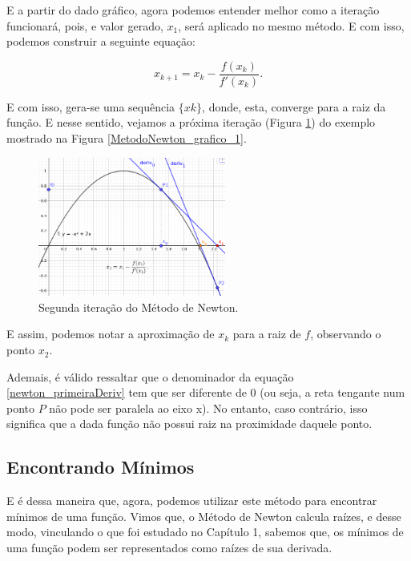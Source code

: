 E a partir do dado gráfico, agora podemos entender melhor como a iteração
funcionará, pois, e valor gerado, $x_1$, será aplicado no mesmo método. E com
isso, podemos construir a seguinte equação:

\begin{equation}
    x_{k+1} = x_{k} - \frac {f(x_{k})}{f'(x_{k})}.
    \label{newton_primeiraDeriv}
\end{equation}

E com isso, gera-se uma sequência $\{xk\}$, donde, esta, converge para a raiz
da função. E nesse sentido, vejamos a próxima iteração (Figura
\ref{MetodoNewton_grafico_2}) do exemplo mostrado na Figura
\ref{MetodoNewton_grafico_1}.

\begin{figure}[ht]
    \includegraphics[width=0.55\textwidth]
      {src/MetodoNewton_grafico_2.png}
    \centering
    \caption{
      \centering
      Segunda iteração do Método de Newton.
    }
    \label{MetodoNewton_grafico_2}
\end{figure}

E assim, podemos notar a aproximação de $x_k$ para a raiz de $f$, observando o
ponto $x_2$.

Ademais, é válido ressaltar que o denominador da equação
\ref{newton_primeiraDeriv} tem que ser diferente de 0 (ou seja, a reta tengante
num ponto $P$ não pode ser paralela ao eixo x). No entanto, caso contrário,
isso significa que a dada função não possui raiz na proximidade daquele ponto.

\subsection{Encontrando Mínimos}

E é dessa maneira que, agora, podemos utilizar este método para encontrar
mínimos de uma função. Vimos que, o Método de Newton calcula raízes, e
desse modo, vinculando o que foi estudado no Capítulo 1, sabemos que, os
mínimos de uma função podem ser representados como raízes de sua derivada.

